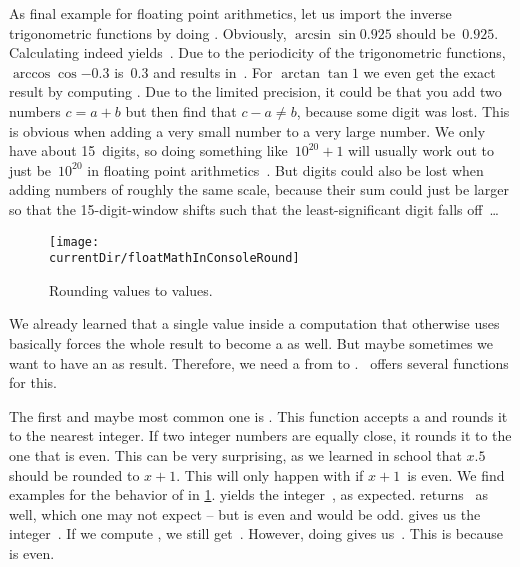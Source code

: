 As final example for floating point arithmetics, let us import the inverse trigonometric functions by doing .
Obviously, $\arcsin{\sin{0.925}}$ should be~$0.925$.
Calculating  indeed yields~.
Due to the periodicity of the trigonometric functions, $\arccos{\cos{-0.3}}$ is~$0.3$ and  results in~.
For $\arctan{\tan{1}}$ we even get the exact result  by computing .%
%
%
%
Due to the limited precision, it could be that you add two numbers $c=a+b$ but then find that $c-a\neq b$, because some digit was lost. %
This is obvious when adding a very small number to a very large number.
We only have about 15~digits, so doing something like~$10^{20} + 1$ will usually work out to just be~$10^{20}$ in floating point arithmetics~\cite{PTVF2007EAAS}.
But digits could also be lost when adding numbers of roughly the same scale, because their sum could just be larger so that the 15-digit-window shifts such that the least-significant digit falls off~\cite{BHK2006NS}{\dots}%
%
\endhsection%
%
%
%
\begin{figure}%
\centering%
\texttt{[image: \\currentDir/floatMathInConsoleRound]}%
\caption{Rounding  values to  values.}%
\label{fig:floatMathInConsoleRound}%
\end{figure}%
%
We already learned that a single  value inside a computation that otherwise uses  basically forces the whole result to become a  as well.
But maybe sometimes we want to have an  as result.
Therefore, we need a  from  to .
\python\ offers several functions for this.

The first and maybe most common one is .
This function accepts a  and rounds it to the nearest integer.
If two integer numbers are equally close, it rounds it to the one that is even.
This can be very surprising, as we learned in school that $x.5$ should be rounded to $x+1$.
This will only happen with  if $x+1$~is even.
We find examples for the behavior of  in \cref{fig:floatMathInConsoleRound}.
 yields the integer~, as expected.
 returns~ as well, which one may not expect -- but  is even and  would be odd.
 gives us the integer~.
If we compute , we still get~.
However, doing  gives us~.
This is because  is even.

